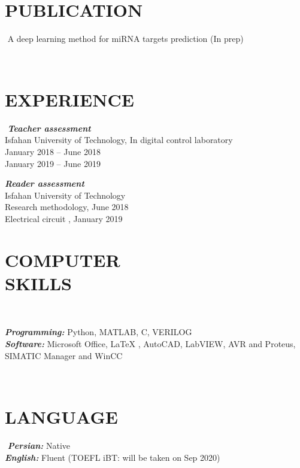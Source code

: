 ‎\documentclass[margin‎, ‎10pt]{res} %
\begin{document}
\begin{resume}
\begin{itemize}
‎\end{itemize}‎ 
 
 
‎\section{PUBLICATION}‎
‎A deep learning method for miRNA targets prediction (In prep)‎

 
‎\section{EXPERIENCE}‎
‎{\sl \textbf{Teacher assessment}} \\‎
 ‎Isfahan University of Technology‎, ‎In digital control laboratory\\‎
 ‎January 2018 – June 2018 \\‎
 ‎January 2019 – June 2019‎ 
 
‎{\sl \textbf{Reader assessment}} \\‎
 ‎Isfahan University of Technology \\‎
‎Research methodology‎, ‎June 2018 \\‎
E‎lectrical circuit ‎, ‎January 2019‎ 
%
‎%
‎%
‎%
‎%
% 
‎\section{COMPUTER \\ SKILLS}‎ 

‎{\sl \textbf{Programming:}}‎ 
‎Python‎, ‎MATLAB‎, ‎C‎, ‎VERILOG‎
‎\vspace{0.2cm}\\‎
‎{\sl \textbf{Software:}}‎
‎Microsoft Office‎, ‎\LaTeX‎ , ‎AutoCAD‎, LabVIEW, ‎AVR and Proteus‎, ‎SIMATIC Manager and WinCC‎ 

‎\section{LANGUAGE}‎
‎{\sl \textbf{Persian:}} Native\\‎
‎{\sl \textbf{English:}} Fluent (TOEFL iBT‎: ‎will be taken on Sep 2020)‎
             

\end{resume}
\end{document}
